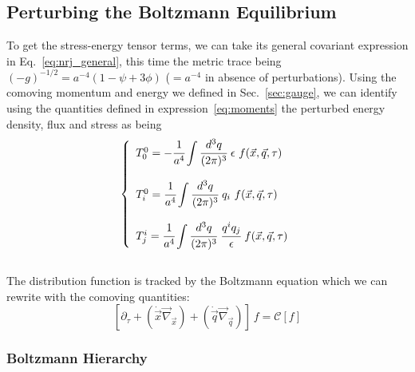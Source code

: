 \subsection{Perturbing the Boltzmann Equilibrium}

To get the stress-energy tensor terms, we can take its general covariant expression in Eq.~\ref{eq:nrj_general}, this time the metric trace being $(-g)^{-1/2} = a^{-4} (1-\psi+3\phi)$ ($= a^{-4}$ in absence of perturbations). Using the comoving momentum and energy we defined in Sec.~\ref{sec:gauge}, we can identify using the quantities defined in expression~\ref{eq:moments} the perturbed energy density, flux and stress as being \\
\begin{equation}
\label{sys:perturb_stress_energy}
\left\{
\begin{array}{l}
T^0_0 = -\cfrac{1}{a^4} \displaystyle \int \cfrac{d^3q}{(2\pi)^3}~ \epsilon~ f(\vec{x}, \vec{q}, \tau)\\
\\
T^0_i = \cfrac{1}{a^4} \displaystyle \int \cfrac{d^3q}{(2\pi)^3}~ q_i~ f(\vec{x}, \vec{q}, \tau)\\
\\
T^i_j = \cfrac{1}{a^4} \displaystyle \int \cfrac{d^3q}{(2\pi)^3}~ \cfrac{q^i q_j}{\epsilon}~ f(\vec{x}, \vec{q}, \tau)
\end{array}
\right.
\end{equation} \\ The distribution function is tracked by the Boltzmann equation which we can rewrite with the comoving quantities: \\
\begin{equation}
\label{eq:boltzmann_reference}
\left[ \partial_\tau + \left( \dot{\vec{x}} \vec{\nabla}_{\vec{x}} \right) + \left( \dot{\vec{q}} \vec{\nabla}_{\vec{q}} \right) \right]~f = \mathcal{C}[f]
\end{equation}

\subsubsection*{Boltzmann Hierarchy}

